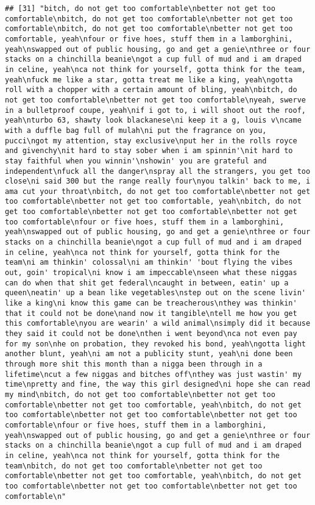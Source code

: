 \documentclass[]{article}
\begin{document}
\begin{verbatim}
## [31] "bitch, do not get too comfortable\nbetter not get too comfortable\nbitch, do not get too comfortable\nbetter not get too comfortable\nbitch, do not get too comfortable\nbetter not get too comfortable, yeah\nfour or five hoes, stuff them in a lamborghini, yeah\nswapped out of public housing, go and get a genie\nthree or four stacks on a chinchilla beanie\ngot a cup full of mud and i am draped in celine, yeah\nca not think for yourself, gotta think for the team, yeah\nfuck me like a star, gotta treat me like a king, yeah\ngotta roll with a chopper with a certain amount of bling, yeah\nbitch, do not get too comfortable\nbetter not get too comfortable\nyeah, swerve in a bulletproof coupe, yeah\nif i got to, i will shoot out the roof, yeah\nturbo 63, shawty look blackanese\ni keep it a g, louis v\ncame with a duffle bag full of mulah\ni put the fragrance on you, pucci\ngot my attention, stay exclusive\nput her in the rolls royce and givenchy\nit hard to stay sober when i am spinnin'\nit hard to stay faithful when you winnin'\nshowin' you are grateful and independent\nfuck all the danger\nspray all the strangers, you get too close\ni said 300 but the range really four\nyou talkin' back to me, i ama cut your throat\nbitch, do not get too comfortable\nbetter not get too comfortable\nbetter not get too comfortable, yeah\nbitch, do not get too comfortable\nbetter not get too comfortable\nbetter not get too comfortable\nfour or five hoes, stuff them in a lamborghini, yeah\nswapped out of public housing, go and get a genie\nthree or four stacks on a chinchilla beanie\ngot a cup full of mud and i am draped in celine, yeah\nca not think for yourself, gotta think for the team\ni am thinkin' colossal\ni am thinkin' 'bout flying the vibes out, goin' tropical\ni know i am impeccable\nseen what these niggas can do when that shit get federal\ncaught in between, eatin' up a queen\neatin' up a bean like vegetables\nstep out on the scene livin' like a king\ni know this game can be treacherous\nthey was thinkin' that it could not be done\nand now it tangible\ntell me how you get this comfortable\nyou are wearin' a wild animal\nsimply did it because they said it could not be done\nthen i went beyond\nca not even pay for my son\nhe on probation, they revoked his bond, yeah\ngotta light another blunt, yeah\ni am not a publicity stunt, yeah\ni done been through more shit this month than a nigga been through in a lifetime\ncut a few niggas and bitches off\nthey was just wastin' my time\npretty and fine, the way this girl designed\ni hope she can read my mind\nbitch, do not get too comfortable\nbetter not get too comfortable\nbetter not get too comfortable, yeah\nbitch, do not get too comfortable\nbetter not get too comfortable\nbetter not get too comfortable\nfour or five hoes, stuff them in a lamborghini, yeah\nswapped out of public housing, go and get a genie\nthree or four stacks on a chinchilla beanie\ngot a cup full of mud and i am draped in celine, yeah\nca not think for yourself, gotta think for the team\nbitch, do not get too comfortable\nbetter not get too comfortable\nbetter not get too comfortable, yeah\nbitch, do not get too comfortable\nbetter not get too comfortable\nbetter not get too comfortable\n"                                                                  
\end{verbatim}
\end{document}
